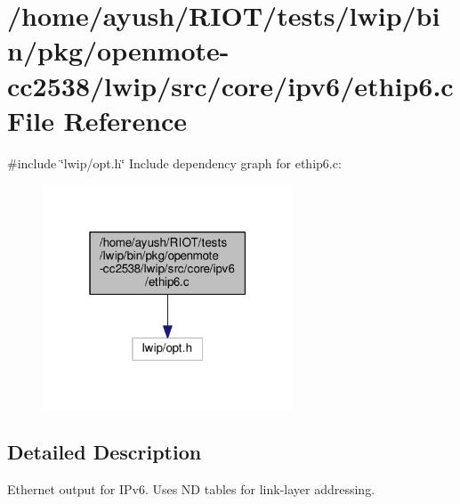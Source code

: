 \hypertarget{openmote-cc2538_2lwip_2src_2core_2ipv6_2ethip6_8c}{}\section{/home/ayush/\+R\+I\+O\+T/tests/lwip/bin/pkg/openmote-\/cc2538/lwip/src/core/ipv6/ethip6.c File Reference}
\label{openmote-cc2538_2lwip_2src_2core_2ipv6_2ethip6_8c}
{\ttfamily \#include \char`\"{}lwip/opt.\+h\char`\"{}}\newline
Include dependency graph for ethip6.\+c\+:
\nopagebreak
\begin{figure}[H]
\begin{center}
\leavevmode
\includegraphics[width=211pt]{openmote-cc2538_2lwip_2src_2core_2ipv6_2ethip6_8c__incl}
\end{center}
\end{figure}


\subsection{Detailed Description}
Ethernet output for I\+Pv6. Uses ND tables for link-\/layer addressing. 